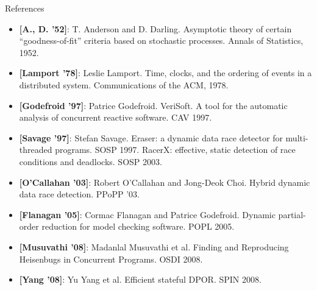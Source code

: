 \documentclass[xcolor=dvipsnames]{beamer}
\begin{document}
\begin{frame}{References}
	\footnotesize
	\begin{itemize}
		\item {\bf [A., D. '52]}: T. Anderson and D. Darling.
			Asymptotic theory of certain ``goodness-of-fit'' criteria based on stochastic processes.
			Annals of Statistics, 1952.
		\item {\bf [Lamport '78]}:
			Leslie Lamport. Time, clocks, and the ordering of events in a distributed system.
			Communications of the ACM, 1978.
		\item {\bf [Godefroid '97]}: Patrice Godefroid.
			VeriSoft. A tool for the automatic analysis of concurrent reactive software. CAV 1997.
		\item {\bf [Savage '97]}: Stefan Savage.
			Eraser: a dynamic data race detector for multi-threaded programs. SOSP 1997.
			RacerX: effective, static detection of race conditions and deadlocks. SOSP 2003.
		\item {\bf [O'Callahan '03]}: Robert O'Callahan and Jong-Deok Choi.
			Hybrid dynamic data race detection. PPoPP '03.
		\item {\bf [Flanagan '05]}: Cormac Flanagan and Patrice Godefroid. Dynamic partial-order reduction for
			model checking software. POPL 2005.
		\item {\bf [Musuvathi '08]}: Madanlal Musuvathi et al. Finding and Reproducing Heisenbugs in Concurrent
			Programs. OSDI 2008.
		\item {\bf [Yang '08]}: Yu Yang et al. Efficient stateful DPOR. SPIN 2008.
	\end{itemize}
\end{frame}
\end{document}
